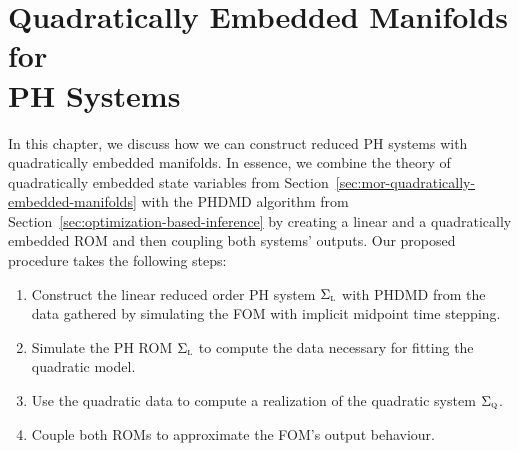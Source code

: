 \chapter[Quadratically Embedded Manifolds for \texorpdfstring{\acl{PH}}{PH} Systems]{%
    Quadratically Embedded Manifolds for \\
    \texorpdfstring{\acl{PH}}{PH} Systems%
}\label{chap:quadratically-embedded-manifolds-ph-systems}

In this chapter, we discuss how we can construct reduced \ac{PH} systems with quadratically embedded manifolds.
In essence, we combine the theory of quadratically embedded state variables from Section~\ref{sec:mor-quadratically-embedded-manifolds} with the \ac{PHDMD} algorithm from Section~\ref{sec:optimization-based-inference} by creating a linear and a quadratically embedded \ac{ROM} and then coupling both systems' outputs.
Our proposed procedure takes the following steps:
\begin{enumerate}
    \item Construct the linear reduced order \ac{PH} system $\Sigma_{\textnormal{\scshape l}}$ with \ac{PHDMD} from the data gathered by simulating the \ac{FOM} with implicit midpoint time stepping.
    \item Simulate the \ac{PH} \ac{ROM} $\Sigma_{\textnormal{\scshape l}}$ to compute the data necessary for fitting the quadratic model.
    \item Use the quadratic data to compute a realization of the quadratic system $\Sigma_{\textnormal{\scshape q}}$.
    \item Couple both \acp{ROM} to approximate the \ac{FOM}'s output behaviour.
\end{enumerate}

